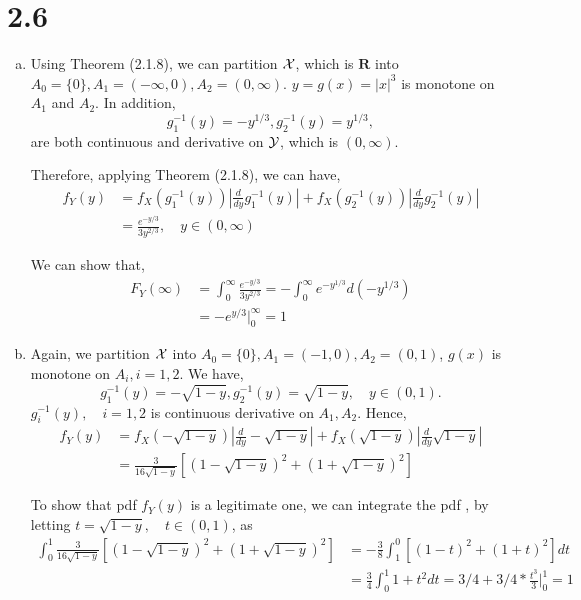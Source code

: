 \documentclass[letter]{article}
\newcommand{\cX}{\cal{X}}
\newcommand{\cY}{\cal{Y}}
\begin{document}
    \section*{2.6}
    \begin{enumerate}[(a)]
    \item Using Theorem (2.1.8), we can partition $\cX$, which is $\mathbf{R}$
    into $A_0 = \{0\}, A_1 = (-\infty, 0), A_2 = (0, \infty)$. $y=g(x) = |x|^3$
    is monotone on $A_1$ and $A_2$. In addition,
    \[
    g_1^{-1}(y) = -y^{1/3}, g_2^{-1}(y) = y^{1/3},
    \] 
    are both continuous and derivative on $\cY$, which is $(0, \infty)$.

    Therefore, applying Theorem (2.1.8), we can have,
    \begin{align*}
    f_Y(y) & = f_X\left(g_1^{-1}(y)\right)\left|\frac{d}{dy} g_1^{-1}(y)\right| +
    f_X\left(g_2^{-1}(y)\right)\left|\frac{d}{dy} g_2^{-1}(y)\right| \\
    & = \frac{e^{-y/3}}{3y^{2/3}}, \quad y \in (0, \infty)
    \end{align*}

    We can show that,
    \begin{align*}
    F_Y(\infty) & = \int_0^\infty \frac{e^{-y/3}}{3 y^{2/3}} =
    - \int_0^\infty e^{-y^{1/3}} d(-y^{1/3}) \\
    & = -e^{y/3}\rvert^\infty_0 = 1
    \end{align*}

    \item Again, we partition $\cX$ into 
    $A_0 = \{0\}, A_1 = (-1, 0), A_2 = (0,1)$, $g(x)$ is monotone on 
    $A_i, i = 1,2$. 
    We have,
    \[
    g_1^{-1}(y) = -\sqrt{1-y}, g_2^{-1}(y) = \sqrt{1-y}, \quad y \in (0,1).
    \]
    $g_i^{-1}(y),\quad i=1,2$ is continuous derivative on $A_1, A_2$. 
    Hence, 
    \begin{align*}
    f_Y(y) & = f_X(-\sqrt{1-y})\left| \frac{d}{dy} -\sqrt{1-y} \right|
    + f_X(\sqrt{1-y})\left| \frac{d}{dy} \sqrt{1-y} \right| \\
    & = \frac{3}{16\sqrt{1-y}}\left[(1-\sqrt{1-y})^2 + (1+\sqrt{1-y})^2\right]
    \end{align*}

    To show that pdf $f_Y(y)$ is a legitimate one, we can integrate the pdf , by letting $t = \sqrt{1-y}, \quad t \in (0, 1)$, as
    \begin{align*}
    \int_0^1 \frac{3}{16\sqrt{1-y}}\left[(1-\sqrt{1-y})^2 + (1+\sqrt{1-y})^2\right] & = -\frac{3}{8} \int_1^0 [(1-t)^2+(1+t)^2] dt \\
    & = \frac{3}{4} \int_0^1 1+ t^2 dt = 3/4 + 3/4*\frac{t^3}{3}|^1_0 = 1
    \end{align*}


\end{enumerate}
\end{document}
